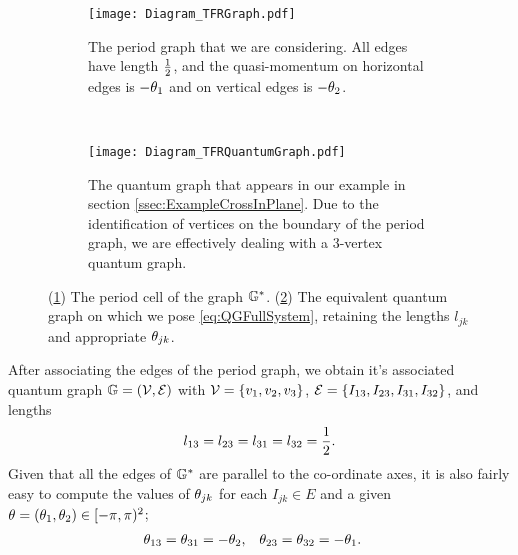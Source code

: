 \begin{figure}[t]
	\centering
	\begin{subfigure}[t]{0.45\textwidth}
		\centering
		\texttt{[image: Diagram\_TFRGraph.pdf]}
		\caption{\label{fig:Diagram_TFRGraph} The period graph that we are considering. All edges have length $\frac{1}{2}$, and the quasi-momentum on horizontal edges is $-\theta_1$ and on vertical edges is $-\theta_2$.}
	\end{subfigure}
	~
	\begin{subfigure}[t]{0.45\textwidth}
		\centering
		\texttt{[image: Diagram\_TFRQuantumGraph.pdf]}
		\caption{\label{fig:Diagram_TFRQuantumGraph} The quantum graph that appears in our example in section \ref{ssec:ExampleCrossInPlane}. Due to the identification of vertices on the boundary of the period graph, we are effectively dealing with a 3-vertex quantum graph.}
	\end{subfigure}
	\caption{\label{fig:5VertexCross} (\ref{fig:Diagram_TFRGraph}) The period cell of the graph $\mathbb{G}^*$. (\ref{fig:Diagram_TFRQuantumGraph}) The equivalent quantum graph on which we pose \eqref{eq:QGFullSystem}, retaining the lengths $l_{jk}$ and appropriate $\theta_{jk}$.}
\end{figure}
After associating the edges of the period graph, we obtain it's associated quantum graph $\mathbb{G}=\left( \mathcal{V},\mathcal{E} \right)$ with $\mathcal{V}=\left\{ v_1,v_2,v_3 \right\}$, $\mathcal{E}=\left\{ I_{13},I_{23},I_{31},I_{32} \right\}$, and lengths
\begin{align*}
	l_{13} = l_{23} = l_{31} = l_{32} = \frac{1}{2}.
\end{align*}
Given that all the edges of $\mathbb{G}^*$ are parallel to the co-ordinate axes, it is also fairly easy to compute the values of $\theta_{jk}$ for each $I_{jk}\in E$ and a given $\theta=\left( \theta_1,\theta_2 \right)\in[-\pi,\pi)^2$;
\begin{align*}
	\theta_{13} = \theta_{31} = -\theta_2, &\quad \theta_{23} = \theta_{32} = -\theta_1.
\end{align*}

